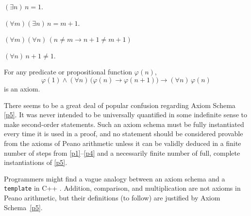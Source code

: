 \documentclass[letterpaper]{article}
\newcommand{\Axiom}{{\large\Bearing}}
\newcommand{\AxiomSchema}{{\large\LooseBearing}}
\begin{document}
\begin{axiom}\label{p1}
	$(\exists n)\,n=1$.
\end{axiom}
\begin{axiom}\label{p2}
	$(\forall m)(\exists n)\,n=m+1$.
\end{axiom}
\begin{axiom}\label{p3}
	$(\forall m)(\forall n)\,(n\ne m\longrightarrow n+1\ne m+1)$
\end{axiom}
\begin{axiom}\label{p4}
	$(\forall n)\,n+1\ne 1$.
\end{axiom}
\begin{axiomschema}\label{p5}
	For any predicate or propositional function $\varphi(n)$,
	\begin{equation}
	\varphi(1)\land(\forall n)\,\big(\varphi(n)\longrightarrow\varphi(n+1)\big)\longrightarrow(\forall n)\,\varphi(n)
	\end{equation}
	is an axiom.
\end{axiomschema}


There seems to be a great deal of popular confusion regarding Axiom Schema \ref{p5}.  It was never intended to be universally quantified in some indefinite sense to make second-order statements.  Such an axiom schema must be fully instantiated every time it is used in a proof, and no statement should be considered provable from the axioms of Peano arithmetic unless it can be validly deduced in a finite number of steps from \Axiom\Axiom \ref{p1}--\ref{p4} and a necessarily finite number of full, complete instantiations of \AxiomSchema \ref{p5}.
\begin{remark}
Programmers might find a vague analogy between an axiom schema and a \texttt{template} in C++ \cite{cpptemplate}.  Addition, comparison, and multiplication are not axioms in Peano arithmetic, but their definitions (to follow) are justified by Axiom Schema~\ref{p5}.
\end{remark}
\end{document}
